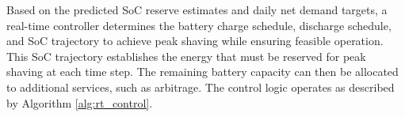 \documentclass[conference]{IEEEtran}
\begin{document}

Based on the predicted SoC reserve estimates and daily net demand targets, a real-time controller determines the battery charge schedule, discharge schedule, and SoC trajectory to achieve peak shaving while ensuring feasible operation. This SoC trajectory establishes the energy that must be reserved for peak shaving at each time step. The remaining battery capacity can then be allocated to additional services, such as arbitrage. The control logic operates as described by Algorithm \ref{alg:rt_control}.
\end{document}
